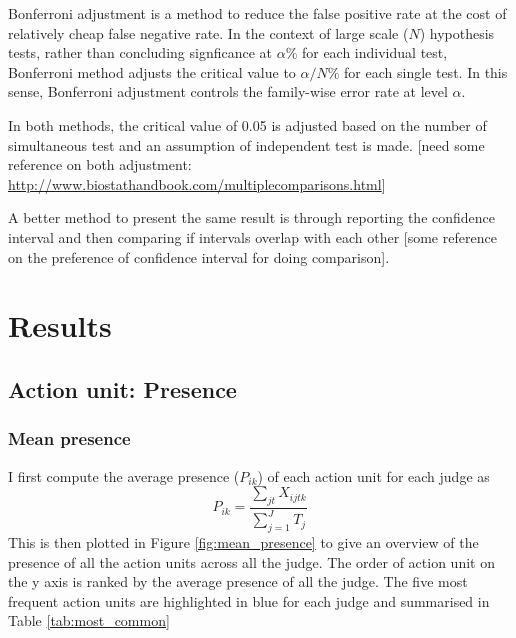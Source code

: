 \documentclass{monashthesis}
\begin{document}
Bonferroni adjustment \autocites{rupert2012simultaneous}{efron2016computer} is a method to reduce the false positive rate at the cost of relatively cheap false negative rate. In the context of large scale (\(N\)) hypothesis tests, rather than concluding signficance at \(\alpha\)\% for each individual test, Bonferroni method adjusts the critical value to \(\alpha/N\)\% for each single test. In this sense, Bonferroni adjustment controls the family-wise error rate at level \(\alpha\).

In both methods, the critical value of 0.05 is adjusted based on the number of simultaneous test and an assumption of independent test is made. {[}need some reference on both adjustment: \url{http://www.biostathandbook.com/multiplecomparisons.html}{]}

A better method to present the same result is through reporting the confidence interval and then comparing if intervals overlap with each other {[}some reference on the preference of confidence interval for doing comparison{]}.

\hypertarget{results}{%
\chapter{Results}\label{results}}

\hypertarget{action-unit-presence}{%
\section{Action unit: Presence}\label{action-unit-presence}}

\hypertarget{mean-presence}{%
\subsection{Mean presence}\label{mean-presence}}

I first compute the average presence (\(P_{ik}\)) of each action unit for each judge as \[P_{ik} = \frac{\sum_{jt}X_{ijtk}}{\sum_{j = 1}^JT_j}\] This is then plotted in Figure \ref{fig:mean_presence} to give an overview of the presence of all the action units across all the judge. The order of action unit on the y axis is ranked by the average presence of all the judge. The five most frequent action units are highlighted in blue for each judge and summarised in Table \ref{tab:most_common}
\end{document}
